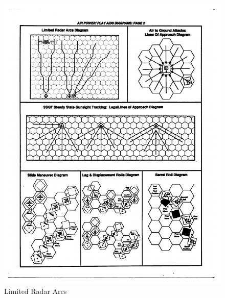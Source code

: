\documentclass[10pt]{article}
\begin{document}
\begin{figure}
\centering
\caption{Limited Radar Arcs}
\medskip
\includegraphics[width=1.0\linewidth]{figures/aids-limited-arc.pdf}
\end{figure}
\end{document}
